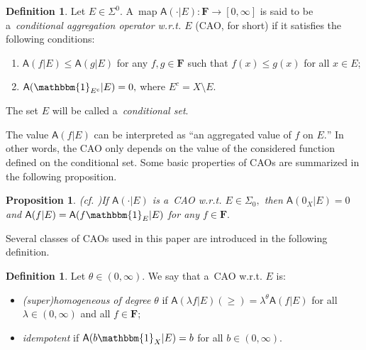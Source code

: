 \documentclass[preprint,11pt]{elsarticle}
\newtheorem{proposition}[tw]{Proposition}
\theoremstyle{definition}
\newtheorem{definition}[tw]{Definition}
\newcommand\bF{\mathbf{F}} %
\newcommand\sA{\mathsf{A}}
\newcommand\aA[2][E]{\sA(#2|#1)}%
\renewcommand\ge{\geqslant}
\renewcommand\le{\leqslant}
\newcommand{\mI}[1]{\mathbbm{1}_{#1}}%
\begin{document}
\begin{definition}\label{def:conagr}
Let $E\in \Sigma^0.$ A~map $\aA{\cdot}\colon \bF\to [0,\infty]$
is said to be a~\textit{conditional aggregation operator w.r.t. $E$} (CAO, for short) if it satisfies the following conditions:
    \begin{enumerate}[leftmargin=1.5cm,noitemsep]
        \item[$(C1)$]  $\aA{f}\le \aA{g}$ for any  $f,g\in\bF$ such that $f(x)\le g(x)$ for all $x\in E$;
        \item[$(C2)$]  $\aA{\mI{E^c}}=0,$ where $E^c=X\setminus E.$
    \end{enumerate}
The set $E$  will be called a~\textit{conditional set}.
\end{definition}

The value $\aA{f}$ can be interpreted as ``an  aggregated value of $f$ on  $E.$'' In other words, the CAO only depends on the value of the considered function defined on the conditional set. Some basic properties of CAOs are summarized in the following proposition.

\begin{proposition}(cf. \cite[Prop. 3.3]{BHHK21})\label{pro:2.2}
If $\aA{\cdot}$ is a~CAO w.r.t. $E\in \Sigma_0,$ then    $\aA{0_X}=0$ and $\aA{f}=\aA{f\mI{E}}$ for any  $f\in\bF.$
\end{proposition}

Several classes of CAOs used in this paper are introduced in the following definition.

\begin{definition}\label{def:properties}
Let $\theta\in (0,\infty).$ We say that a~CAO w.r.t. $E$ is:
\begin{itemize}[noitemsep]
    \item  \textit{(super)homogeneous of degree} $\theta$  if $\aA{\lambda f}(\ge)=\lambda^{\theta} \aA{f}$  for all  $\lambda\in (0,\infty)$ and all $f\in\bF$;

    \item \textit{idempotent} if $\aA{b\mI{X}}=b$ for all $b\in (0,\infty).$



     \end{itemize}
\end{definition}
\end{document}
